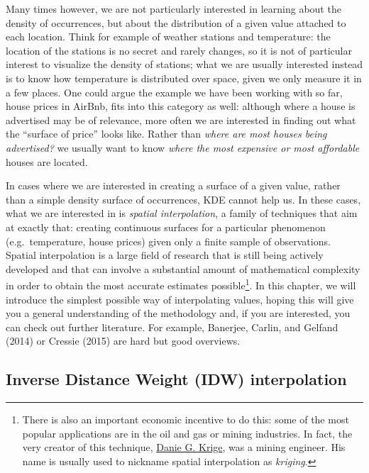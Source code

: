 \documentclass[
  letterpaper,
  krantz2]{style/krantz}
\begin{document}
Many times however, we are not particularly interested in learning about
the density of occurrences, but about the distribution of a given value
attached to each location. Think for example of weather stations and
temperature: the location of the stations is no secret and rarely
changes, so it is not of particular interest to visualize the density of
stations; what we are usually interested instead is to know how
temperature is distributed over space, given we only measure it in a few
places. One could argue the example we have been working with so far,
house prices in AirBnb, fits into this category as well: although where
a house is advertised may be of relevance, more often we are interested
in finding out what the ``surface of price'' looks like. Rather than
\emph{where are most houses being advertised?} we usually want to know
\emph{where the most expensive or most affordable} houses are located.

In cases where we are interested in creating a surface of a given value,
rather than a simple density surface of occurrences, KDE cannot help us.
In these cases, what we are interested in is \emph{spatial
interpolation}, a family of techniques that aim at exactly that:
creating continuous surfaces for a particular phenomenon
(e.g.~temperature, house prices) given only a finite sample of
observations. Spatial interpolation is a large field of research that is
still being actively developed and that can involve a substantial amount
of mathematical complexity in order to obtain the most accurate
estimates possible\footnote{There is also an important economic
  incentive to do this: some of the most popular applications are in the
  oil and gas or mining industries. In fact, the very creator of this
  technique, \href{https://en.wikipedia.org/wiki/Danie_G._Krige}{Danie
  G. Krige}, was a mining engineer. His name is usually used to nickname
  spatial interpolation as \emph{kriging}.}. In this chapter, we will
introduce the simplest possible way of interpolating values, hoping this
will give you a general understanding of the methodology and, if you are
interested, you can check out further literature. For example, Banerjee,
Carlin, and Gelfand (2014) or Cressie (2015) are hard but good
overviews.

\hypertarget{inverse-distance-weight-idw-interpolation}{%
\subsection{Inverse Distance Weight (IDW)
interpolation}\label{inverse-distance-weight-idw-interpolation}}
\end{document}
